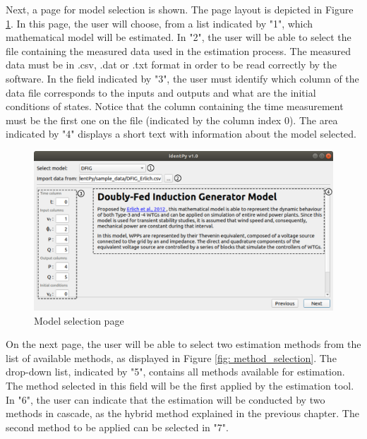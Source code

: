 Next, a page for model selection is shown. The page layout is depicted in Figure \ref{fig: model_selection}. In this page, the user will choose, from a list indicated by "1", which mathematical model will be estimated. In "2", the user will be able to select the file containing the measured data used in the estimation process. The measured data must be in .csv, .dat or .txt format in order to be read correctly by the software. In the field indicated by "3", the user must identify which column of the data file corresponds to the inputs and outputs and what are the initial conditions of states. Notice that the column containing the time measurement must be the first one on the file (indicated by the column index $0$). The area indicated by "4" displays a short text with information about the model selected.

\begin{figure}[!h]
	\caption{Model selection page}
	\begin{center}
		\includegraphics[scale=.5]{Images/Software_model_page.eps}
	\end{center}
	\label{fig: model_selection}
\end{figure}

On the next page, the user will be able to select two estimation methods from the list of available methods, as displayed in Figure \ref{fig: method_selection}. The drop-down list, indicated by "5", contains all methods available for estimation. The method selected in this field will be the first applied by the estimation tool. In "6", the user can indicate that the estimation will be conducted by two methods in cascade, as the hybrid method explained in the previous chapter. The second method to be applied can be selected in "7".

